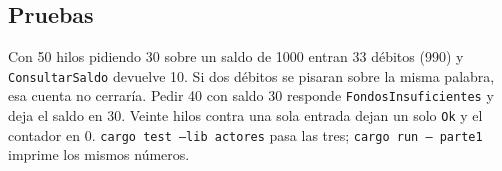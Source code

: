 \subsection{Pruebas}

Con 50 hilos pidiendo 30 sobre un saldo de 1000 entran 33 débitos (990) y
\texttt{ConsultarSaldo} devuelve 10. Si dos débitos se pisaran sobre la
misma palabra, esa cuenta no cerraría. Pedir 40 con saldo 30 responde
\texttt{FondosInsuficientes} y deja el saldo en 30. Veinte hilos contra
una sola entrada dejan un solo \texttt{Ok} y el contador en 0.
\texttt{cargo test --lib actores} pasa las tres; \texttt{cargo run --
parte1} imprime los mismos números.
